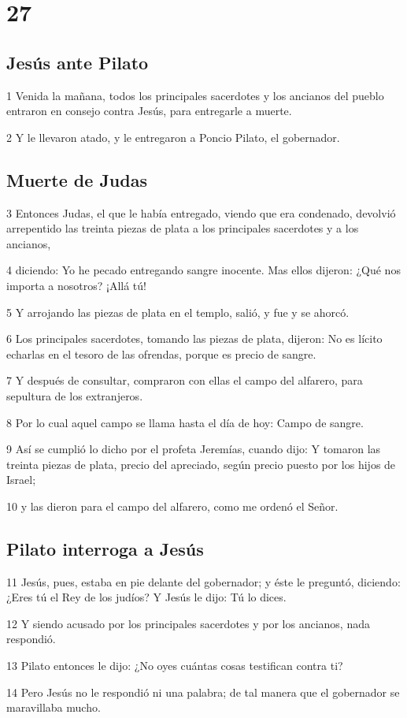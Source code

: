 \chapter{27}

\section*{Jesús ante Pilato}

\par 1 Venida la mañana, todos los principales sacerdotes y los ancianos del pueblo entraron en consejo contra Jesús, para entregarle a muerte.
\par 2 Y le llevaron atado, y le entregaron a Poncio Pilato, el gobernador.

\section*{Muerte de Judas}

\par 3 Entonces Judas, el que le había entregado, viendo que era condenado, devolvió arrepentido las treinta piezas de plata a los principales sacerdotes y a los ancianos,
\par 4 diciendo: Yo he pecado entregando sangre inocente. Mas ellos dijeron: ¿Qué nos importa a nosotros? ¡Allá tú!
\par 5 Y arrojando las piezas de plata en el templo, salió, y fue y se ahorcó.
\par 6 Los principales sacerdotes, tomando las piezas de plata, dijeron: No es lícito echarlas en el tesoro de las ofrendas, porque es precio de sangre.
\par 7 Y después de consultar, compraron con ellas el campo del alfarero, para sepultura de los extranjeros.
\par 8 Por lo cual aquel campo se llama hasta el día de hoy: Campo de sangre.
\par 9 Así se cumplió lo dicho por el profeta Jeremías, cuando dijo: Y tomaron las treinta piezas de plata, precio del apreciado, según precio puesto por los hijos de Israel;
\par 10 y las dieron para el campo del alfarero, como me ordenó el Señor.

\section*{Pilato interroga a Jesús}

\par 11 Jesús, pues, estaba en pie delante del gobernador; y éste le preguntó, diciendo: ¿Eres tú el Rey de los judíos? Y Jesús le dijo: Tú lo dices.
\par 12 Y siendo acusado por los principales sacerdotes y por los ancianos, nada respondió.
\par 13 Pilato entonces le dijo: ¿No oyes cuántas cosas testifican contra ti?
\par 14 Pero Jesús no le respondió ni una palabra; de tal manera que el gobernador se maravillaba mucho.


